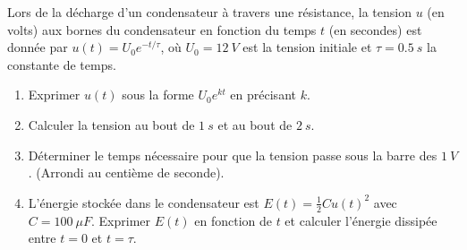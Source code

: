 \documentclass[11pt]{article}
\begin{document}
\begin{exercice}
Lors de la décharge d'un condensateur à travers une résistance, la tension $u$ (en volts) aux bornes du condensateur en fonction du temps $t$ (en secondes) est donnée par $u(t) = U_0 e^{-t/\tau}$, où $U_0 = \SI{12}{V}$ est la tension initiale et $\tau = \SI{0,5}{s}$ la constante de temps.
\begin{enumerate}
    \item Exprimer $u(t)$ sous la forme $U_0 e^{kt}$ en précisant $k$.
    \item Calculer la tension au bout de $\SI{1}{s}$ et au bout de $\SI{2}{s}$.
    \item Déterminer le temps nécessaire pour que la tension passe sous la barre des $\SI{1}{V}$. (Arrondi au centième de seconde).
    \item L'énergie stockée dans le condensateur est $E(t) = \frac{1}{2}C u(t)^2$ avec $C = \SI{100}{\mu F}$. Exprimer $E(t)$ en fonction de $t$ et calculer l'énergie dissipée entre $t=0$ et $t=\tau$.
\end{enumerate}
\end{exercice}
\end{document}
